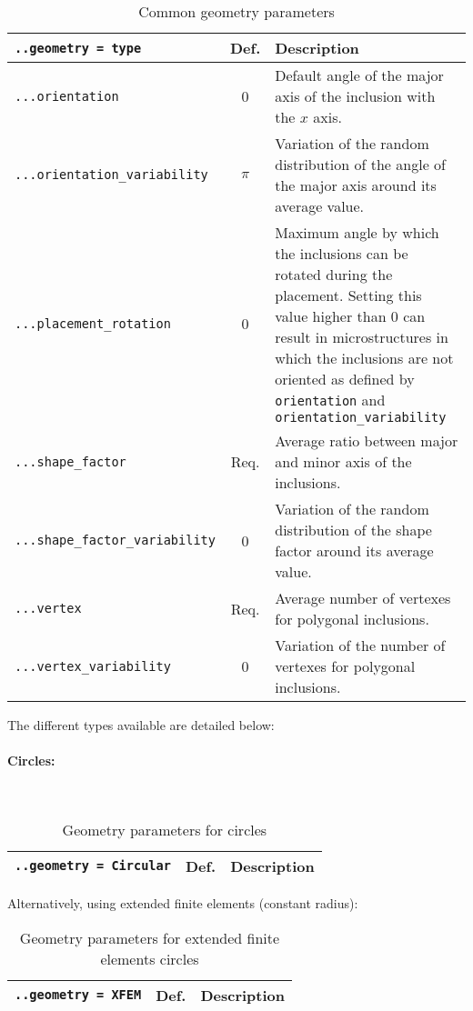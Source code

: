 \documentclass[10pt]{article}
\newcommand{\whiteline}{\textcolor{white}{.\\}}
\begin{document}
\begin{table}[h!]
\begin{tabularx}{\textwidth}{lcX}
\verb+..geometry = type+ & Def. & Description\\
\hline
\verb+...orientation+ & 0 & Default angle of the major axis of the inclusion with the $x$ axis.\\
\verb+...orientation_variability+ & $\pi$ & Variation of the random distribution of the angle of the major axis around its average value.\\
\verb+...placement_rotation+ & 0 & Maximum angle by which the inclusions can be rotated during the placement. Setting this value higher than 0 can result in microstructures in which the inclusions are not oriented as defined by \verb+orientation+ and \verb+orientation_variability+\\
\verb+...shape_factor+ &  Req. & Average ratio between major and minor axis of the inclusions.\\
\verb+...shape_factor_variability+ & 0 & Variation of the random distribution of the shape factor around its average value.\\
\verb+...vertex+ &  Req. & Average number of vertexes for polygonal inclusions.\\
\verb+...vertex_variability+ & 0 & Variation of the number of vertexes for polygonal inclusions.\\
\hline
\end{tabularx}
\caption{Common geometry parameters}
\end{table}

The different types available are detailed below:

\paragraph{Circles:} \whiteline

\begin{table}[h!]
\begin{tabularx}{\textwidth}{lcX}
\verb+..geometry = Circular+ & Def. & Description\\
\hline
\end{tabularx}
\caption{Geometry parameters for circles}
\end{table}

Alternatively, using extended finite elements (constant radius):

\begin{table}[h!]
\begin{tabularx}{\textwidth}{lcX}
\verb+..geometry = XFEM+ & Def. & Description\\
\hline
\end{tabularx}
\caption{Geometry parameters for extended finite elements circles}
\end{table}
\end{document}
